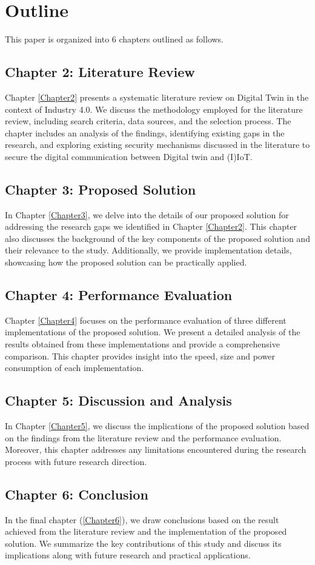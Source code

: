 \section{Outline}
This paper is organized into 6 chapters outlined as follows. 
\subsection{Chapter 2: Literature Review}
Chapter \ref{Chapter2} presents a systematic literature review on Digital Twin in the context of Industry 4.0. We discuss the methodology employed for the literature review, including search criteria, data sources, and the selection process. The chapter includes an analysis of the findings, identifying existing gaps in the research, and exploring existing security mechanisms discussed in the literature to secure the digital communication between Digital twin and (I)IoT.

\subsection{Chapter 3: Proposed Solution}
In Chapter \ref{Chapter3}, we delve into the details of our proposed solution for addressing the research gaps we identified in Chapter \ref{Chapter2}. This chapter also discusses the background of the key components of the proposed solution and their relevance to the study. Additionally, we provide implementation details, showcasing how the proposed solution can be practically applied.

\subsection{Chapter 4: Performance Evaluation}
Chapter \ref{Chapter4} focuses on the performance evaluation of three different implementations of the proposed solution. We present a detailed analysis of the results obtained from these implementations and provide a comprehensive comparison. This chapter provides insight into the speed, size and power consumption of each implementation.

\subsection{Chapter 5: Discussion and Analysis}
In Chapter \ref{Chapter5}, we discuss the implications of the proposed solution based on the findings from the literature review and the performance evaluation. Moreover, this chapter addresses any limitations encountered during the research process with future research direction.


\subsection{Chapter 6: Conclusion}
In the final chapter (\ref{Chapter6}), we draw conclusions based on the result achieved from the literature review and the implementation of the proposed solution. We summarize the key contributions of this study and discuss its implications along with future research and practical applications.



